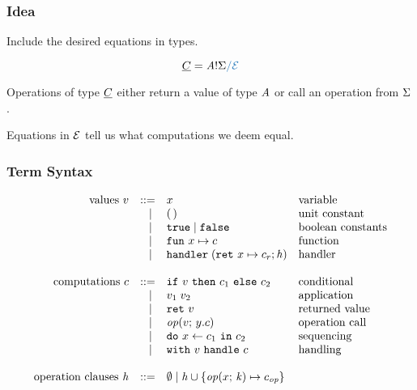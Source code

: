 \documentclass[usenames,dvipsnames]{beamer}
\begin{document}
\begin{frame}
	\frametitle{Idea}
	Include the desired equations in types.

  \[
    \ctyC = \tyA \bang \sig \new{\witheq \eqE}
  \]

  Operations of type $\underline{C}$ either return a value of type $\mathit{A}$ or call an operation from $\Sigma$ .
  \vspace{5mm}

  Equations in $\mathcal{E}$ tell us what computations we deem equal.
\end{frame}
\begin{frame}
  \frametitle{Term Syntax}
  
\[
	\begin{array}{rrll}
		\text{values}~v
		 & ::=   & x                                                                              & \text{variable}          \\
		 & \vsep & \unit                                                                          & \text{unit constant}     \\
		 & \vsep & \true \vsep \false                                                             & \text{boolean constants} \\
		 & \vsep & \fun{x}{c}                                                                     & \text{function}          \\
		 & \vsep & \handler{\hcases}                                                              & \text{handler}           \\
		 \\
		 \text{computations}~c
		 & ::=   & \ifclause{v}{c_1}{c_2}                                                         & \text{conditional}       \\
		 & \vsep & \apply{v_1}{v_2}                                                               & \text{application}       \\
		 & \vsep & \return{v}                                                                     & \text{returned value}    \\
		 & \vsep & \operation{v}{y.c}                                                             & \text{operation call}    \\
		 & \vsep & \dobind{x}{c_1}{c_2}                                                           & \text{sequencing}        \\
		 & \vsep & \withhandle{v}{c}                                                              & \text{handling}					\\
		 \\
		 \text{operation clauses}~\hcases
		  & ::=   & \emptyhcases \vsep \hcases \union \set{\operation{x}{\contin} \mapsto c_{\op}}                            \\
		\end{array}
		\]
\end{frame}
\end{document}
